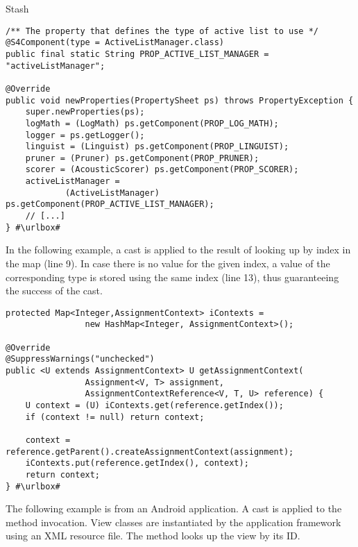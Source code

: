 \begin{pattern}{Stash}
\def\urlvar{http://bit.ly/skerit_cmusphinx_2HGgL1D}
\begin{verbatim}
/** The property that defines the type of active list to use */
@S4Component(type = ActiveListManager.class)
public final static String PROP_ACTIVE_LIST_MANAGER = "activeListManager";

@Override
public void newProperties(PropertySheet ps) throws PropertyException {
    super.newProperties(ps);
    logMath = (LogMath) ps.getComponent(PROP_LOG_MATH);
    logger = ps.getLogger();
    linguist = (Linguist) ps.getComponent(PROP_LINGUIST);
    pruner = (Pruner) ps.getComponent(PROP_PRUNER);
    scorer = (AcousticScorer) ps.getComponent(PROP_SCORER);
    activeListManager = 
            (ActiveListManager) ps.getComponent(PROP_ACTIVE_LIST_MANAGER);
    // [...]
} #\urlbox#
\end{verbatim}

In the following example,
a cast is applied to the result of looking up by index in the  map (line 9).
In case there is no value for the given index,
a value of the corresponding type is stored using the same index (line 13),
thus guaranteeing the success of the cast.

\def\urlvar{http://bit.ly/UniTime_cpsolver_2HUmGki}
\begin{verbatim}
protected Map<Integer,AssignmentContext> iContexts =
                new HashMap<Integer, AssignmentContext>();

@Override
@SuppressWarnings("unchecked")
public <U extends AssignmentContext> U getAssignmentContext(
                Assignment<V, T> assignment,
                AssignmentContextReference<V, T, U> reference) {
    U context = (U) iContexts.get(reference.getIndex());
    if (context != null) return context;
    
    context = reference.getParent().createAssignmentContext(assignment);
    iContexts.put(reference.getIndex(), context);
    return context;
} #\urlbox#
\end{verbatim}


The following  example is from an Android application.
A cast is applied to the  method invocation.
View classes are instantiated by the application framework using an XML resource file.
The  method looks up the view by its ID.


\end{pattern}

